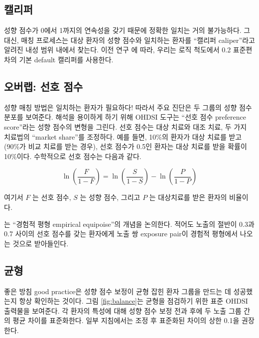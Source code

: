 \documentclass[10.5pt]{book}
\theoremstyle{definition}
\theoremstyle{definition}
\theoremstyle{definition}
\theoremstyle{remark}
\begin{document}
\subsection{캘리퍼}


성향 점수가 0에서 1까지의 연속성을 갖기 때문에 정확한 일치는 거의
불가능하다. 그 대신, 매칭 프로세스는 대상 환자의 성향 점수와 일치하는
환자를 ``캘리퍼 caliper''라고 알려진 내성 범위 내에서 찾는다. 이전 연구
\citep{austin_2011} 에 따라, 우리는 로직 척도에서 0.2 표준편차의 기본
default 캘리퍼를 사용한다.

\subsection{오버랩: 선호 점수}\label{--}


성향 매칭 방법은 일치하는 환자가 필요하다! 따라서 주요 진단은 두 그룹의
성향 점수 분포를 보여준다. 해석을 용이하게 하기 위해 OHDSI 도구는 ``선호
점수 preference score''라는 성향 점수의 변형을 그린다.
\citep{walker_2013} 선호 점수는 대상 치료와 대조 치료, 두 가지 치료법의
``market share''를 조정하다. 예를 들면, 10\%의 환자가 대상 치료를 받고
(90\%가 비교 치료를 받는 경우), 선호 점수가 0.5인 환자는 대상 치료를
받을 확률이 10\%이다. 수학적으로 선호 점수는 다음과 같다.

\[\ln\left(\frac{F}{1-F}\right)=\ln\left(\frac{S}{1-S}\right)-\ln\left(\frac{P}{1-P}\right)\]

여기서 \(F\) 는 선호 점수, \(S\) 는 성향 점수, 그리고 \(P\) 는
대상치료를 받은 환자의 비율이다.

\citet{walker_2013} 는 ``경험적 평형 empirical equipoise''의 개념을
논의한다. 적어도 노출의 절반이 0.3과 0.7 사이의 선호 점수를 갖는
환자에게 노출 쌍 exposure pair이 경험적 평형에서 나오는 것으로
받아들인다. 

\subsection{균형}

 

좋은 방침 good practice은 성향 점수 보정이 균형 잡힌 환자 그룹을 만드는
데 성공했는지 항상 확인하는 것이다. 그림 \ref{fig:balance}는 균형을
점검하기 위한 표준 OHDSI 출력물을 보여준다. 각 환자의 특성에 대해 성향
점수 보정 전과 후에 두 노출 그룹 간의 평균 차이를 표준화한다. 일부
지침에서는 조정 후 표준화된 차이의 상한 0.1을 권장한다.
\citep{rubin_2001}
\end{document}

